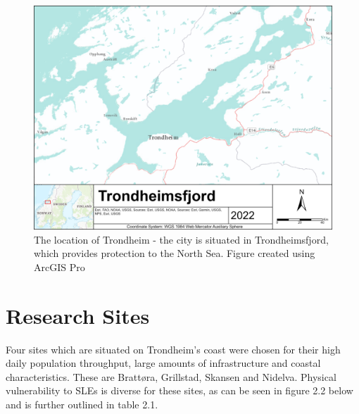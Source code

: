\begin{figure}[h!]
    \centering
    \includegraphics[width=1.0\textwidth]{fig/Trondheimsfjord.png}
    \caption{The location of Trondheim - the city is situated in Trondheimsfjord, which provides protection to the North Sea. Figure created using ArcGIS Pro}
    \label{fig:research area Trondheim}
\end{figure}



\section{Research Sites}
Four sites which are situated on Trondheim's coast were chosen for their high daily population throughput, large amounts of infrastructure and coastal characteristics. These are Brattøra, Grillstad, Skansen and Nidelva. Physical vulnerability to SLEs is diverse for these sites, as can be seen in figure 2.2 below and is further outlined in table 2.1. 
\paragraph{}

